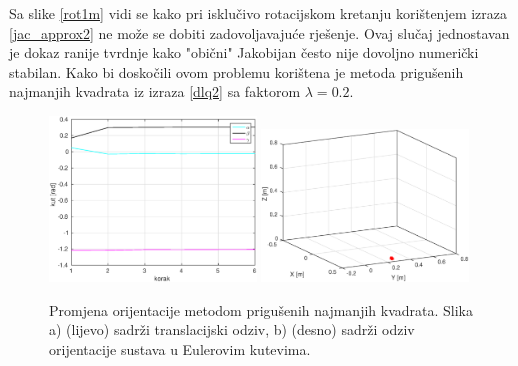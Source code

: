 \documentclass[times, utf8, diplomski, numeric]{fer}
\begin{document}
Sa slike \ref{rot1m} vidi se kako pri isklučivo rotacijskom kretanju korištenjem izraza \ref{jac_approx2} ne može se dobiti zadovoljavajuće rješenje.
Ovaj slučaj jednostavan je dokaz ranije tvrdnje kako "obični" Jakobijan često nije dovoljno numerički stabilan.
Kako bi doskočili ovom problemu korištena je metoda prigušenih najmanjih kvadrata iz izraza \ref{dlq2} sa faktorom $\lambda = 0.2$.
\begin{figure}[h!]
\centering
\includegraphics[width = 0.49\textwidth]{matlab_rot2}
\includegraphics[width = 0.49\textwidth]{matlab_rot2_xyz}
\caption{Promjena orijentacije metodom prigušenih najmanjih kvadrata.
Slika a) (lijevo) sadrži translacijski odziv, b) (desno) sadrži odziv orijentacije sustava u Eulerovim kutevima.} \label{rot2m}
\end{figure}
\end{document}
